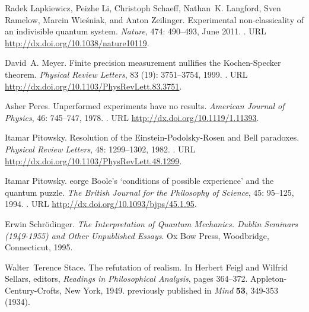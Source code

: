 \documentclass[runningheads]{llncs}
\begin{document}
\begin{thebibliography}{25}
Radek Lapkiewicz, Peizhe Li, Christoph Schaeff, Nathan~K. Langford, Sven
  Ramelow, Marcin Wie{\'{s}}niak, and Anton Zeilinger.
\newblock Experimental non-classicality of an indivisible quantum system.
\newblock \emph{Nature}, 474: 490--493, June 2011.
\newblock {}.
\newblock URL \url{http://dx.doi.org/10.1038/nature10119}.

David~A. Meyer.
\newblock Finite precision measurement nullifies the {K}ochen-{S}pecker
  theorem.
\newblock \emph{Physical Review Letters}, 83 (19):
  3751--3754, 1999.
\newblock {}.
\newblock URL \url{http://dx.doi.org/10.1103/PhysRevLett.83.3751}.

Asher Peres.
\newblock Unperformed experiments have no results.
\newblock \emph{American Journal of Physics}, 46: 745--747, 1978.
\newblock {}.
\newblock URL \url{http://dx.doi.org/10.1119/1.11393}.

Itamar Pitowsky.
\newblock Resolution of the {E}instein-{P}odolsky-{R}osen and {B}ell paradoxes.
\newblock \emph{Physical Review Letters}, 48: 1299--1302, 1982.
\newblock {}.
\newblock URL \url{http://dx.doi.org/10.1103/PhysRevLett.48.1299}.

Itamar Pitowsky.
eorge {B}oole's `conditions of possible experience' and the
  quantum puzzle.
\newblock \emph{The British Journal for the Philosophy of Science},
  45: 95--125, 1994.
\newblock {}.
\newblock URL \url{http://dx.doi.org/10.1093/bjps/45.1.95}.

Erwin Schr{\"{o}}dinger.
\newblock \emph{The Interpretation of Quantum Mechanics. {D}ublin Seminars
  (1949-1955) and Other Unpublished Essays}.
\newblock Ox Bow Press, Woodbridge, Connecticut, 1995.

Walter~Terence Stace.
\newblock The refutation of realism.
\newblock In Herbert Feigl and Wilfrid Sellars, editors, \emph{Readings in
  Philosophical Analysis}, pages 364--372. Appleton-Century-Crofts, New York,
  1949.
\newblock previously published in {\em Mind} {\bf 53}, 349-353 (1934).


\end{thebibliography}
\end{document}
